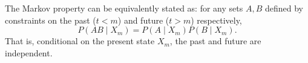 The Markov property can be equivalently stated as: for any sets $A, B$ defined by constraints on the past ($t < m$) and future ($t > m$) respectively,
$$P(AB \mid X_m) = P(A \mid X_m) P(B \mid X_m).$$
That is, conditional on the present state $X_m$, the past and future are independent.
